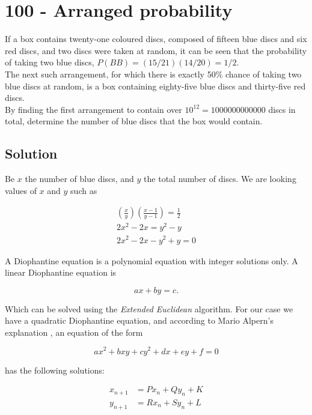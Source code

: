 \chapter*{100 - Arranged probability}

If a box contains twenty-one coloured discs, composed of fifteen blue discs and six red discs, and two discs were taken at random, it can be seen that the probability of taking two blue discs, $P(BB) = (15/21)(14/20) = 1/2$.\\

The next such arrangement, for which there is exactly 50\% chance of taking two blue discs at random, is a box containing eighty-five blue discs and thirty-five red discs.\\

By finding the first arrangement to contain over $10^{12} = 1000000000000$ discs in total, determine the number of blue discs that the box would contain.

\section*{Solution}

Be $x$ the number of blue discs, and $y$ the total number of discs. We are looking values of $x$ and $y$ such as

\begin{align*}
    \left ( \frac{x}{y} \right ) \left ( \frac{x-1}{y-1} \right ) = \frac{1}{2} \\
    2x^2 - 2x = y^2 - y \\
    2x^2 - 2x - y^2 + y = 0
\end{align*}

A Diophantine equation is a polynomial equation with integer solutions only. A linear Diophantine equation is

$$
ax + by = c.
$$

Which can be solved using the \textit{Extended Euclidean} algorithm. For our case we have a quadratic Diophantine equation, and according to Mario Alpern's explanation \cite{quadratic_diophantine}, an equation of the form

$$
 ax^2 + bxy + cy^2 + dx + ey + f = 0
$$

has the following solutions:

\begin{align*}
    x_{n+1} &= Px_n + Qy_n + K \\
    y_{n+1} &= Rx_n + Sy_n + L
\end{align*}

